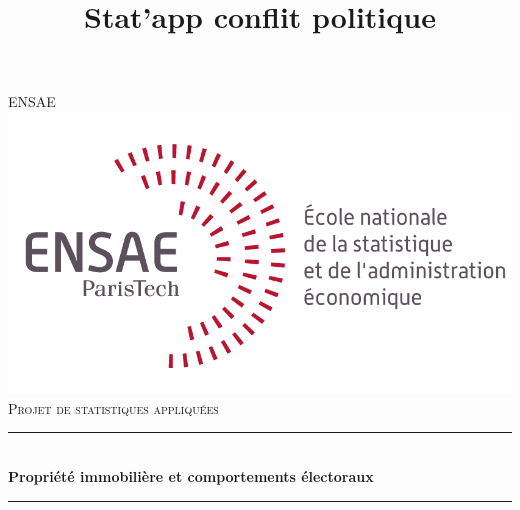 \documentclass[12pt]{article}
\title{Stat'app conflit politique}
\begin{document}
\begin{titlepage}

\newcommand{\HRule}{\rule{\linewidth}{0.5mm}} %

\center %
 

\textsc{\LARGE ENSAE}\\[0.5cm] %
\includegraphics[scale=1.2]{ensae_logo_dev.png}\\[1cm] %
\textsc{\Large Projet de statistiques appliquées}\\[0.5cm] %


\HRule \\[0.4cm]
{ \huge \bfseries Propriété immobilière et comportements électoraux}\\[0.4cm] %
\HRule \\[1.5cm]
 


\end{titlepage}
\end{document}
